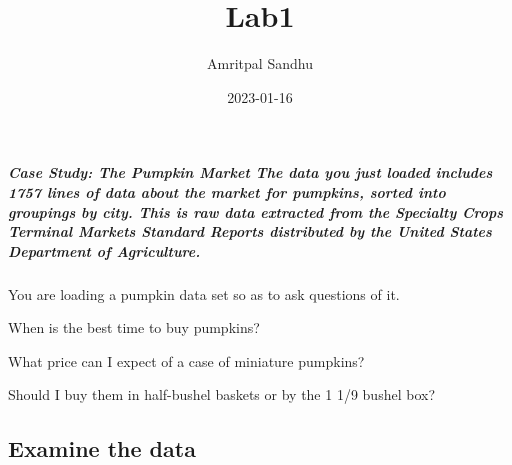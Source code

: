 \documentclass[
]{article}
\title{Lab1}
\author{Amritpal Sandhu}
\date{2023-01-16}
\begin{document}
\maketitle

\hypertarget{case-study-the-pumpkin-market-the-data-you-just-loaded-includes-1757-lines-of-data-about-the-market-for-pumpkins-sorted-into-groupings-by-city.-this-is-raw-data-extracted-from-the-specialty-crops-terminal-markets-standard-reports-distributed-by-the-united-states-department-of-agriculture.}{%
\subparagraph{Case Study: The Pumpkin Market The data you just loaded
includes 1757 lines of data about the market for pumpkins, sorted into
groupings by city. This is raw data extracted from the Specialty Crops
Terminal Markets Standard Reports distributed by the United States
Department of
Agriculture.}\label{case-study-the-pumpkin-market-the-data-you-just-loaded-includes-1757-lines-of-data-about-the-market-for-pumpkins-sorted-into-groupings-by-city.-this-is-raw-data-extracted-from-the-specialty-crops-terminal-markets-standard-reports-distributed-by-the-united-states-department-of-agriculture.}}

You are loading a pumpkin data set so as to ask questions of it.

When is the best time to buy pumpkins?

What price can I expect of a case of miniature pumpkins?

Should I buy them in half-bushel baskets or by the 1 1/9 bushel box?

\hypertarget{examine-the-data}{%
\subsection{Examine the data}\label{examine-the-data}}
\end{document}
